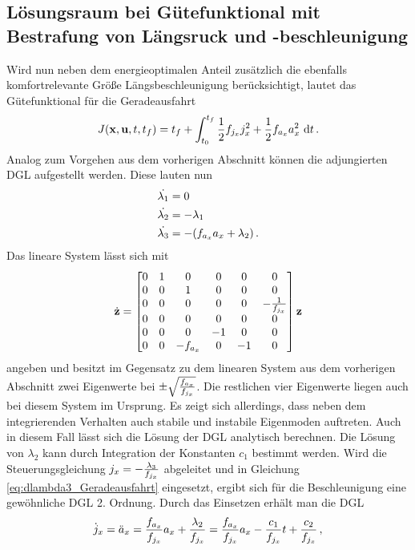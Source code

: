 \subsection{Lösungsraum bei Gütefunktional mit Bestrafung von Längsruck und -beschleunigung}\label{subsec:Lösungsraum_ax_jx}
Wird nun neben dem energieoptimalen Anteil zusätzlich die ebenfalls komfortrelevante Größe Längsbeschleunigung berücksichtigt, lautet das Gütefunktional für die Geradeausfahrt 
\begin{equation}
J(\boldsymbol{\mathrm{x}},\boldsymbol{\mathrm{u}},t,t_f) = t_f + \int_{t_0}^{t_f}\frac{1}{2}f_{j_x} j_x^2 + \frac{1}{2}f_{a_x} a_x^2~\textrm{d}{t}\,.
\end{equation}
Analog zum Vorgehen aus dem vorherigen Abschnitt können die adjungierten \gls{DGL} aufgestellt werden. Diese lauten nun
\begin{align}
\dot{\lambda_1} &= 0 \\
\dot{\lambda_2} &= -\lambda_1 \\
\dot{\lambda_3} &= -(f_{a_x} a_x + \lambda_2)\,. \label{eq:dlambda3_Geradeausfahrt}
\end{align}
Das lineare System lässt sich mit \begin{equation}
\dot{\boldsymbol{\mathrm{z}}} = \begin{bmatrix}
0 & 1 & 0 & 0 & 0 & 0 \\
0 & 0 & 1 & 0 & 0 & 0 \\
0 & 0 & 0 & 0 & 0 & -\frac{1}{f_{j_x}} \\
0 & 0 & 0 & 0 & 0 & 0 \\
0 & 0 & 0 & -1 & 0 & 0 \\
0 & 0 & -f_{a_x} & 0 & -1 & 0 \\
\end{bmatrix}\boldsymbol{\mathrm{z}}
\end{equation}
angeben und besitzt im Gegensatz zu dem linearen System aus dem vorherigen Abschnitt zwei Eigenwerte bei $\pm\sqrt{\frac{f_{a_x}}{f_{j_x}}}$. Die restlichen vier Eigenwerte liegen auch bei diesem System im Ursprung. Es zeigt sich allerdings, dass neben dem integrierenden Verhalten auch stabile und instabile Eigenmoden auftreten. Auch in diesem Fall lässt sich die Lösung der \gls{DGL} analytisch berechnen. Die Lösung von $\lambda_2$ kann durch Integration der Konstanten $c_1$ bestimmt werden. Wird die Steuerungsgleichung $j_x = -\frac{\lambda_3}{f_{j_x}}$ abgeleitet und in Gleichung \eqref{eq:dlambda3_Geradeausfahrt} eingesetzt, ergibt sich für die Beschleunigung eine gewöhnliche \gls{DGL} 2. Ordnung. Durch das Einsetzen erhält man die \gls{DGL}
\begin{equation}
\dot{j}_x = \ddot{a}_x = \frac{f_{a_x}}{f_{j_x}}a_x + \frac{\lambda_2}{f_{j_x}} = \frac{f_{a_x}}{f_{j_x}}a_x - \frac{c_1}{f_{j_x}}t + \frac{c_2}{f_{j_x}} \,, \label{eq:DGL_ax}
\end{equation}
